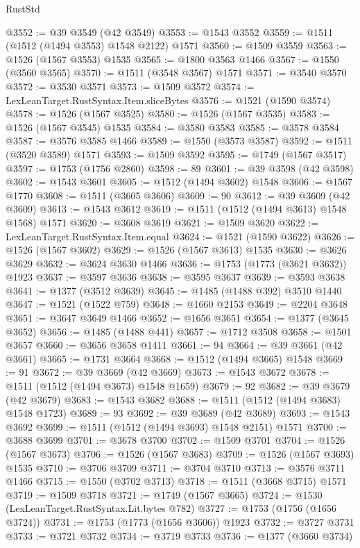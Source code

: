 \begin{lexlean}{RustStd}
\begin{coremodule}
{{@3552 := @39 @3549 (@42 @3549)
@3553 := @1543 @3552
@3559 := @1511 (@1512 (@1494 @3553) @1548 @2122) @1571
@3560 := @1509 @3559
@3563 := @1526 (@1567 @3553) @1535
@3565 := @1800 @3563 @1466
@3567 := @1550 (@3560 @3565)
@3570 := @1511 (@3548 @3567) @1571
@3571 := @3540 @3570
@3572 := @3530 @3571
@3573 := @1509 @3572
@3574 := LexLeanTarget.RustSyntax.Item.sliceBytes
@3576 := @1521 (@1590 @3574)
@3578 := @1526 (@1567 @3525)
@3580 := @1526 (@1567 @3535)
@3583 := @1526 (@1567 @3545) @1535
@3584 := @3580 @3583
@3585 := @3578 @3584
@3587 := @3576 @3585 @1466
@3589 := @1550 (@3573 @3587)
@3592 := @1511 (@3520 @3589) @1571
@3593 := @1509 @3592
@3595 := @1749 (@1567 @3517)
@3597 := @1753 (@1756 @2860)
@3598 := 89
@3601 := @39 @3598 (@42 @3598)
@3602 := @1543 @3601
@3605 := @1512 (@1494 @3602) @1548
@3606 := @1567 @1770
@3608 := @1511 (@3605 @3606)
@3609 := 90
@3612 := @39 @3609 (@42 @3609)
@3613 := @1543 @3612
@3619 := @1511 (@1512 (@1494 @3613) @1548 @1568) @1571
@3620 := @3608 @3619
@3621 := @1509 @3620
@3622 := LexLeanTarget.RustSyntax.Item.equal
@3624 := @1521 (@1590 @3622)
@3626 := @1526 (@1567 @3602)
@3629 := @1526 (@1567 @3613) @1535
@3630 := @3626 @3629
@3632 := @3624 @3630 @1466
@3636 := @1753 (@1773 (@3621 @3632)) @1923
@3637 := @3597 @3636
@3638 := @3595 @3637
@3639 := @3593 @3638
@3641 := @1377 (@3512 @3639)
@3645 := @1485 (@1488 @392) @3510 @1440
@3647 := @1521 (@1522 @759)
@3648 := @1660 @2153
@3649 := @2204 @3648
@3651 := @3647 @3649 @1466
@3652 := @1656 @3651
@3654 := @1377 (@3645 @3652)
@3656 := @1485 (@1488 @441)
@3657 := @1712 @3508
@3658 := @1501 @3657
@3660 := @3656 @3658 @1411
@3661 := 94
@3664 := @39 @3661 (@42 @3661)
@3665 := @1731 @3664
@3668 := @1512 (@1494 @3665) @1548
@3669 := 91
@3672 := @39 @3669 (@42 @3669)
@3673 := @1543 @3672
@3678 := @1511 (@1512 (@1494 @3673) @1548 @1659)
@3679 := 92
@3682 := @39 @3679 (@42 @3679)
@3683 := @1543 @3682
@3688 := @1511 (@1512 (@1494 @3683) @1548 @1723)
@3689 := 93
@3692 := @39 @3689 (@42 @3689)
@3693 := @1543 @3692
@3699 := @1511 (@1512 (@1494 @3693) @1548 @2151) @1571
@3700 := @3688 @3699
@3701 := @3678 @3700
@3702 := @1509 @3701
@3704 := @1526 (@1567 @3673)
@3706 := @1526 (@1567 @3683)
@3709 := @1526 (@1567 @3693) @1535
@3710 := @3706 @3709
@3711 := @3704 @3710
@3713 := @3576 @3711 @1466
@3715 := @1550 (@3702 @3713)
@3718 := @1511 (@3668 @3715) @1571
@3719 := @1509 @3718
@3721 := @1749 (@1567 @3665)
@3724 := @1530 (LexLeanTarget.RustSyntax.Lit.bytes @782)
@3727 := @1753 (@1756 (@1656 @3724))
@3731 := @1753 (@1773 (@1656 @3606)) @1923
@3732 := @3727 @3731
@3733 := @3721 @3732
@3734 := @3719 @3733
@3736 := @1377 (@3660 @3734)
}}
\end{coremodule}
\end{lexlean}
